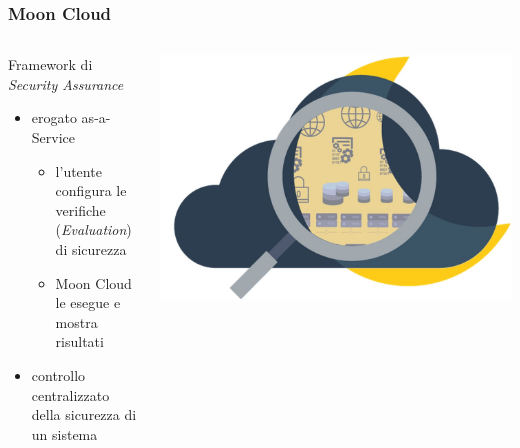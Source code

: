 \begin{frame}
    \frametitle{Moon Cloud}
    \begin{columns}
        \begin{column}{0.55\textwidth}
            Framework di \alert{\textit{Security Assurance}}
            \begin{itemize}
                \item erogato \alert{as-a-Service}
                \begin{itemize}
                    \item l'utente configura le verifiche (\alert{\textit{Evaluation}}) di sicurezza
                    \item Moon Cloud le esegue e mostra risultati
                \end{itemize}
                \item controllo \alert{centralizzato} della sicurezza di un sistema
            \end{itemize}
        \end{column}
        \begin{column}{0.4\textwidth}
            \begin{center}
                \includegraphics[scale=0.12]{images/mc}
            \end{center}
        \end{column}
    \end{columns}
\end{frame}


